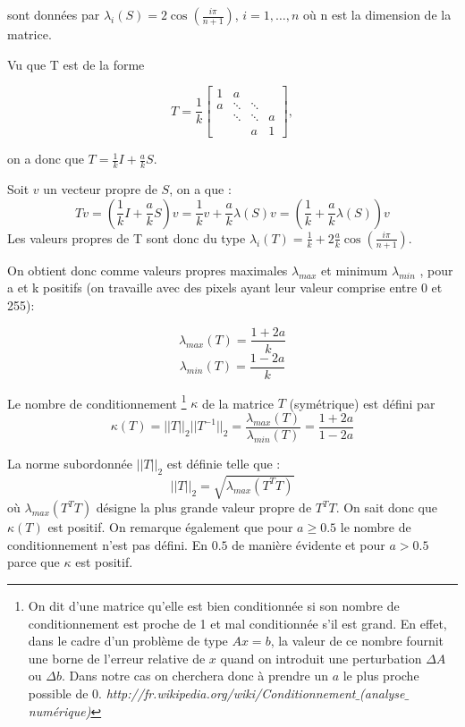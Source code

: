 sont données par $\lambda_i(S) = 2 \cos(\frac{i\pi}{n+1})$, $i= 1, \ldots , n$ où n est la dimension de la matrice.

Vu que T est de la forme 

$$
 T = \frac{1}{k}
 \left[
 \begin{array}{cccc}
    1 & a 		& 			& \\
    a & \ddots 	& \ddots 	& \\
      & \ddots 	& \ddots 	& a \\
      & 		& a			& 1
  \end{array}
  \right] ,
$$

on a donc que $T = \frac{1}{k} I + \frac{a}{k} S$.

Soit $v$ un vecteur propre de $S$, on a que : 
\begin{equation}
T v = ( \frac{1}{k} I + \frac{a}{k} S ) v = \frac{1}{k} v + \frac{a}{k} \lambda(S) v = (\frac{1}{k} + \frac{a}{k} \lambda(S)) v
\end{equation}
Les valeurs propres de T sont donc du type $\lambda_i(T) = \frac{1}{k} + 2 \frac{a}{k} \cos(\frac{i\pi}{n+1})$.

On obtient donc comme valeurs propres maximales $\lambda_{max}$ et minimum $\lambda_{min}$ , pour a et k positifs (on travaille avec des pixels ayant leur valeur comprise entre 0 et 255): 

	$$\lambda_{max} (T) =  \frac{1+2a}{k} $$
	$$\lambda_{min} (T) =  \frac{1-2a}{k} $$
	
Le nombre de conditionnement
\footnote{On dit d'une matrice qu'elle est bien conditionnée si son nombre de conditionnement est proche de 1 et mal conditionnée s'il est grand. En effet, dans le cadre d'un problème de type $Ax = b$, la valeur de ce nombre fournit une borne de l'erreur relative de $x$ quand on introduit une perturbation $\Delta A $ ou $\Delta b$. Dans notre cas on cherchera donc à prendre un $a$ le plus proche possible de 0. \textit{http://fr.wikipedia.org/wiki/Conditionnement$\_$(analyse$\_$numérique)}}
 $\kappa$ de la matrice $T$ (symétrique) est défini par 
\begin{equation}
	\kappa (T) = ||T||_2||T^{-1}||_2 = \frac{\lambda_{max} (T)}{\lambda_{min} (T)} = \frac{1+2a}{1-2a}
\end{equation}

La norme subordonnée $||T||_2$ est définie telle que : 
$$||T||_2 = \sqrt{\lambda_{max}(T^TT)}$$
où $\lambda_{max}(T^TT)$ désigne la plus grande valeur propre de $T^TT$.
On sait donc que $\kappa(T) $ est positif.	
On remarque également que pour $a \geq 0.5$ le nombre de conditionnement n'est pas défini. En $0.5$ de manière évidente et pour $a > 0.5$ parce que $\kappa$ est positif. 

